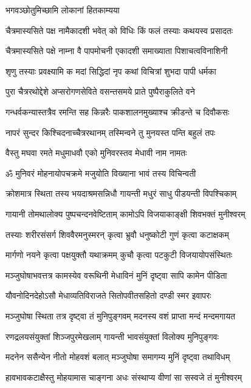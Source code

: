 \onelineshloka
{भगवञ्छोतुमिच्छामि लोकानां हितकाम्यया} %

\twolineshloka
{चैत्रमास्यसिते पक्ष नामैकादशी भवेत्}
{को विधिः किं फलं तस्याः कथयस्व प्रसादतः} %


\twolineshloka
{चैत्रमास्यसिते पक्षे नाम्ना वै पापमोचनी}
{एकादशी समाख्याता पिशाचत्वविनाशिनी} %

\twolineshloka
{शृणु तस्याः प्रवक्ष्यामि क मदां सिद्धिदां नृप}
{कथां विचित्रां शुभदा पापी धर्मका} %

\twolineshloka
{पुरा चैत्ररथोद्देशे अप्सरोगणसेविते}
{वसन्तसमये प्राते पुष्पैराकुलिते वने} %

\twolineshloka
{गन्धर्वकन्यास्तत्रैव रमन्ति सह किन्नरैः}
{पाकशालनमुख्याश्च क्रीडन्ते च दिवौकसः} %

\twolineshloka
{नापरं सुन्दर किश्चिदनाच्चैत्ररथानम्}
{तस्मिन्वने तु मुनयस्त पन्ति बहुलं तपः} %

\twolineshloka
{वैस्तु मघवा रमते मधुमाधवौ}
{एको मुनिवरस्तव मेधावी नाम नामतः} %

\twolineshloka
{ॐ मुनिवरं मोहनायोपचक्रमे}
{मजुयोति विख्याना भावं तस्य विचिन्वती} %

\twolineshloka
{क्रोशमात्र स्थिता तस्य भयदाश्रमसन्निधौ}
{गायन्ती मधुरं साधु पीडयन्ती विपश्चिकाम्} %

\twolineshloka
{गायानी तोमथालोक्य पुष्पचन्दनवेष्टिताम्}
{कामोऽपि विजयाकाङ्क्षी शिवभक्तं मुनीश्वरम्} %

\twolineshloka
{तस्याः शरीरसंसर्ग शिववैरमनुस्मरन्}
{कृत्वा भ्रुवौ धनुष्कोटी गुणं कृत्वा कटाक्षकम्} %

\twolineshloka
{मार्गणो नयने कृत्वा पक्षयुक्तौ यथाक्रमम्}
{कुचौ कृत्वा पटकुटी विजयायोपसंस्थितः} %

\twolineshloka
{मञ्जुघोषाभवत्तत्र कामस्येव वरूथिनी}
{मेधाविनं मुनिं दृष्ट्वा सापि कामेन पीडिता} %

\twolineshloka
{यौवनोदिनदेहोऽसौ मेधाव्यतिविराजते}
{सितोपवीतसहितो दण्डी स्मर इवापरः} %

\twolineshloka
{मञ्जुघोषा स्थिता तत्र दृष्ट्वा तं मुनिपुङ्गवम्}
{मदनस्य वशं प्राप्ता मन्दं मन्दमगायत} %

\twolineshloka
{रणद्रलयसंयुक्तां शिञ्जपुरमेखलाम्}
{गायन्ती भावसंयुक्तां विलोक्य मुनिपुङ्गवः} %

\twolineshloka
{मदनेन ससैन्येन नीतो मोहवशं बलात्}
{मञ्जुघोषा समागम्य मुनिं दृष्ट्वा तथाविधम्} %

\twolineshloka
{हावभावकटाक्षैस्तु मोहयामास चाङ्गना}
{अधः संस्थाप्य वीणां सा सस्वजे तं मुनीश्वरम्} %

